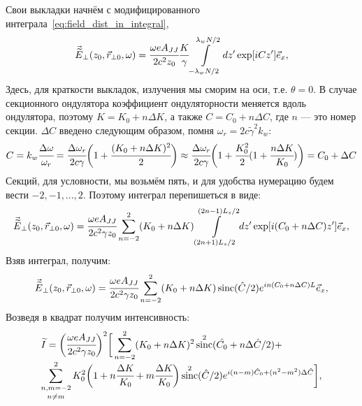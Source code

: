 \documentclass[14pt,a4paper]{extarticle}
\numberwithin{equation}{section}
\DeclareMathOperator{\sinc}{sinc}
\begin{document}
Свои выкладки начнём с модифицированного интеграла~\ref{eq:field_dist_in_integral}, 
\begin{equation}
	\begin{array}{lcl}
	\vec{\widetilde{E}}_{\bot}(z_0,  \vec{r}_{\bot 0}, \omega) =
	\cfrac{\omega eA_{JJ}}{2c^2z_0}\cfrac{K}{\gamma}
	\displaystyle\int\limits_{-\lambda_w N/2}^{\lambda_w N/2} dz'
	\exp[iCz'] 	\vec{e}_x,
	\end{array}	
\end{equation} 
Здесь, для краткости выкладок, излучения мы сморим на оси, т.е. $\theta = 0$. В случае секционного ондулятора коэффициент ондуляторности меняется вдоль ондулятора, поэтому $K = K_0 + n\Delta K$, а также $C = C_0 + n\Delta C$, где $n$ --- это номер секции. $\Delta {C}$ введено следующим образом, помня $\omega_r = 2c\widetilde{\gamma}^2k_w$:
\begin{equation}
	C =k_w\cfrac{\Delta \omega}{\omega_r} = \cfrac{\Delta \omega_r}{2c\gamma}\bigg(1 + \cfrac{(K_0 + n\Delta K)^2}{2}\bigg) \approx \cfrac{\Delta \omega_r}{2c\gamma}\bigg(1 + \cfrac{K^2_0}{2}(1 + \cfrac{n\Delta K}{K_0})\bigg) = C_0 + \Delta C
\end{equation} 
Секций, для условности, мы возьмём пять, и для удобства нумерацию будем вести $-2, -1, ... , 2$. Поэтому интеграл перепишеться в виде:
\begin{equation}
	\begin{array}{lcl}
	\vec{\widetilde{E}}_{\bot}(z_0,  \vec{r}_{\bot 0}, \omega) =
	\cfrac{\omega eA_{JJ}}{2c^2 \gamma z_0}
	\displaystyle\sum\limits_{n =-2}^{2}(K_0 + n\Delta K)
	\displaystyle\int\limits_{(2n + 1)L_s/2}^{(2n - 1)L_s/2} dz'
	\exp[i(C_0 + n\Delta C)z']	\vec{e}_x,
	\end{array}	
\end{equation} 
Взяв интеграл, получим:
\begin{equation}
	\begin{array}{lcl}
	\vec{\widetilde{E}}_{\bot}(z_0,  \vec{r}_{\bot 0}, \omega) =
	\cfrac{\omega eA_{JJ}}{2c^2 \gamma z_0}
	\displaystyle\sum\limits_{n =-2}^{2}(K_0 + n\Delta K)
	\sinc(\hat{C}/2)e^{in({C}_0 + n\Delta {C})L}	\vec{e}_x,
	\end{array}	
\end{equation} 
Возведя в квадрат получим интенсивность:
\begin{equation}
	\begin{array}{lcl}
	{\widetilde{I}} =
	\bigg(\cfrac{\omega eA_{JJ}}{2c^2 \gamma z_0}\bigg)^2\bigg[
	\displaystyle\sum\limits_{n =-2}^{2}(K_0 + n\Delta K)^2\sinc^2(\hat{C_0} + n\Delta \hat{C}/2) + \\
		
	\displaystyle\mathop{\sum\limits_{n, m =-2}^{2}}_{n \neq m}K^2_0\bigg(1 + n\cfrac{\Delta K}{K_0} + m\cfrac{\Delta K}{K_0}\bigg)
	\sinc^2(\hat{C}/2)e^{i(n-m)\hat{C}_0 + (n^2 - m^2)\Delta \hat{C}}\bigg],
	\end{array}	
\end{equation} 
\end{document}
